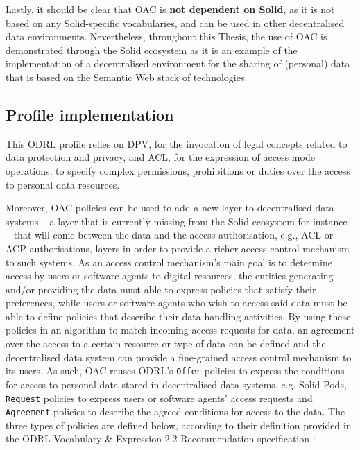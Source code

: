 
Lastly, it should be clear that OAC is \textbf{not dependent on Solid}, as it is not based on any Solid-specific vocabularies, and can be used in other decentralised data environments.
Nevertheless, throughout this Thesis, the use of OAC is demonstrated through the Solid ecosystem as it is an example of the implementation of a decentralised environment for the sharing of (personal) data that is based on the Semantic Web stack of technologies.

\subsection{Profile implementation}
\label{sec:oac_implementation}

This ODRL profile relies on DPV, for the invocation of legal concepts related to data protection and privacy, and ACL, for the expression of access mode operations, to specify complex permissions, prohibitions or duties over the access to personal data resources.

Moreover, OAC policies can be used to add a new layer to decentralised data systems -- a layer that is currently missing from the Solid ecosystem for instance -- that will come between the data and the access authorisation, e.g., ACL or ACP authorisations, layers in order to provide a richer access control mechanism to such systems.
As an access control mechanism's main goal is to determine access by users or software agents to digital resources, the entities generating and/or providing the data must able to express policies that satisfy their preferences, while users or software agents who wish to access said data must be able to define policies that describe their data handling activities. 
By using these policies in an algorithm to match incoming access requests for data, an agreement over the access to a certain resource or type of data can be defined and the decentralised data system can provide a fine-grained access control mechanism to its users.
As such, OAC reuses ODRL's \texttt{Offer} policies to express the conditions for access to personal data stored in decentralised data systems, e.g. Solid Pods, \texttt{Request} policies to express users or software agents' access requests and \texttt{Agreement} policies to describe the agreed conditions for access to the data. 
The three types of policies are defined below, according to their definition provided in the ODRL Vocabulary \& Expression 2.2 Recommendation specification \citep{iannella_odrl_vocab_2018}:

